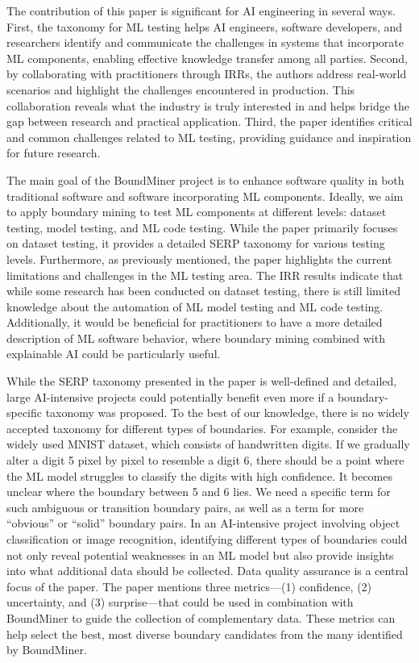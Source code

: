 \documentclass[11pt]{article}
\begin{document}
The contribution of this paper is significant for AI engineering in several ways. First, the taxonomy for ML testing helps AI engineers, software developers, and researchers identify and communicate the challenges in systems that incorporate ML components, enabling effective knowledge transfer among all parties. Second, by collaborating with practitioners through IRRs, the authors address real-world scenarios and highlight the challenges encountered in production. This collaboration reveals what the industry is truly interested in and helps bridge the gap between research and practical application. Third, the paper identifies critical and common challenges related to ML testing, providing guidance and inspiration for future research.

The main goal of the BoundMiner project is to enhance software quality in both traditional software and software incorporating ML components. Ideally, we aim to apply boundary mining to test ML components at different levels: dataset testing, model testing, and ML code testing. While the paper primarily focuses on dataset testing, it provides a detailed SERP taxonomy for various testing levels. Furthermore, as previously mentioned, the paper highlights the current limitations and challenges in the ML testing area. The IRR results indicate that while some research has been conducted on dataset testing, there is still limited knowledge about the automation of ML model testing and ML code testing. Additionally, it would be beneficial for practitioners to have a more detailed description of ML software behavior, where boundary mining combined with explainable AI could be particularly useful.

While the SERP taxonomy presented in the paper is well-defined and detailed, large AI-intensive projects could potentially benefit even more if a boundary-specific taxonomy was proposed. To the best of our knowledge, there is no widely accepted taxonomy for different types of boundaries. For example, consider the widely used MNIST dataset, which consists of handwritten digits. If we gradually alter a digit 5 pixel by pixel to resemble a digit 6, there should be a point where the ML model struggles to classify the digits with high confidence. It becomes unclear where the boundary between 5 and 6 lies. We need a specific term for such ambiguous or transition boundary pairs, as well as a term for more “obvious” or “solid” boundary pairs. In an AI-intensive project involving object classification or image recognition, identifying different types of boundaries could not only reveal potential weaknesses in an ML model but also provide insights into what additional data should be collected. Data quality assurance is a central focus of the paper. The paper mentions three metrics—(1) confidence, (2) uncertainty, and (3) surprise—that could be used in combination with BoundMiner to guide the collection of complementary data. These metrics can help select the best, most diverse boundary candidates from the many identified by BoundMiner.
\end{document}
